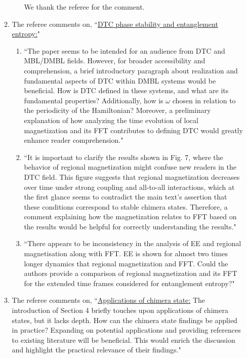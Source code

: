 \documentclass[aps,prb,reprint,showpacs,floatfix,superscriptaddress, onecolumn, nofootinbib, 10pt]{revtex4-2}
\newcommand{\response}[1]{{\color{black}#1}} %
\newcommand{\comment}[1]{{\color{blue}#1}} %
\begin{document}
\begin{enumerate}
\begin{enumerate}
\begin{enumerate}
			\response{We thank the referee for the comment. 
			}
		\end{enumerate}
		\item The referee comments on, \comment{``\underline{DTC phase stability and entanglement entropy:}"}\\
		\begin{enumerate}
			\item \comment{``The paper seems to be intended for an audience from DTC and MBL/DMBL fields. However, for broader accessibility and comprehension, a brief introductory paragraph about realization and fundamental aspects of DTC within DMBL
				systems would be beneficial. How is DTC defined in these systems, and what are its fundamental properties? Additionally, how is $\omega$ chosen in relation to the
				periodicity of the Hamiltonian? Moreover, a preliminary explanation of how analyzing the time evolution of local magnetization and its FFT contributes to defining DTC would greatly enhance reader comprehension."}
			\item \comment{``It is important to clarify the results shown in Fig. 7, where the behavior of regional magnetization might confuse new readers in the DTC field. This figure suggests that regional magnetization decreases over time under strong coupling and all-to-all interactions, which at the first glance seems to contradict the main text’s assertion that these conditions correspond to stable chimera states. Therefore, a comment  explaining how the magnetization relates to FFT based on the results would be helpful for correctly understanding the results."}
			\item \comment{``There appears to be inconsistency in the analysis of EE and regional magnetisation along with FFT. EE is shown for almost two times longer dynamics that regional magnetization and FFT. Could the authors provide a comparison of regional  magnetization and its FFT for the extended time frames considered for entanglement entropy?"}
		\end{enumerate}
		\item The referee comments on, \comment{``\underline{Applications of chimera state:} The introduction of Section 4 briefly touches upon applications of chimera states, but it lacks depth. How can the chimera state findings be applied in practice? Expanding on potential applications and providing references to existing literature will be beneficial. This would enrich the discussion and highlight the practical relevance of their findings."}
	\end{enumerate}


\end{enumerate}
\end{document}
